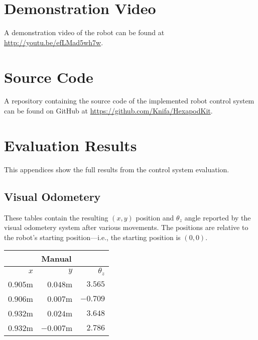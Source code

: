 \begin{appendices}

\chapter{Demonstration Video}

A demonstration video of the robot can be found at \url{http://youtu.be/efLMad5wh7w}.

\chapter{Source Code}

A repository containing the source code of the implemented robot control system can be found on GitHub at \url{https://github.com/Knifa/HexapodKit}.

\chapter{Evaluation Results}

This appendices show the full results from the control system evaluation.

\section{Visual Odometery}

These tables contain the resulting $(x, y)$ position and $\theta_z$ angle reported by the visual odometery system after various movements. The positions are relative to the robot's starting position---i.e., the starting position is $(0, 0)$.

\begin{table}[!h]
	\centering
	\begin{tabular}{ r r r }
		\toprule
		\multicolumn{3}{c}{\textbf{Manual}} \\
		\midrule
		\textbf{$x$} & \textbf{$y$} & \textbf{$\theta_z$} \\
		\midrule
		$0.905$m &
		$0.048$m &
		$3.565$\textdegree{} \\

		$0.906$m &
		$0.007$m &
		$-0.709$\textdegree{} \\

		$0.932$m &
		$0.024$m &
		$3.648$\textdegree{} \\

		$0.932$m &
		$-0.007$m &
		$2.786$\textdegree{} \\


\end{tabular}
\end{table}
\end{appendices}
